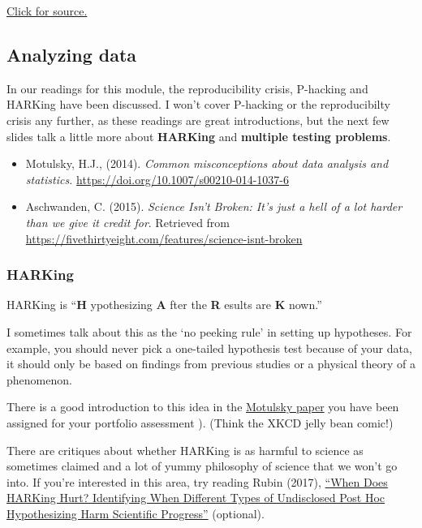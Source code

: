 \documentclass[
  openany]{book}
\providecommand{\tightlist}{%
  \setlength{\itemsep}{0pt}\setlength{\parskip}{0pt}}
\begin{document}
\href{https://www.thequotes.net/2013/08/failures-are-stepping-stones-to-success/}{Click for source.}

\hypertarget{analyzingethics}{%
\subsection{Analyzing data}\label{analyzingethics}}

In our readings for this module, the reproducibility crisis, P-hacking and HARKing have been discussed. I won't cover P-hacking or the reproducibilty crisis any further, as these readings are great introductions, but the next few slides talk a little more about \textbf{HARKing} and \textbf{multiple testing problems}.

\begin{itemize}
\tightlist
\item
  Motulsky, H.J., (2014). \emph{Common misconceptions about data analysis and statistics.} \url{https://doi.org/10.1007/s00210-014-1037-6}
\item
  Aschwanden, C. (2015). \emph{Science Isn't Broken: It's just a hell of a lot harder than we give it credit for}. Retrieved from \url{https://fivethirtyeight.com/features/science-isnt-broken}
\end{itemize}

\hypertarget{harking}{%
\subsubsection{HARKing}\label{harking}}

HARKing is ``\textbf{H} ypothesizing \textbf{A} fter the \textbf{R} esults are \textbf{K} nown.''

I sometimes talk about this as the `no peeking rule' in setting up hypotheses. For example, you should never pick a one-tailed hypothesis test because of your data, it should only be based on findings from previous studies or a physical theory of a phenomenon.

There is a good introduction to this idea in the \href{https://link.springer.com/article/10.1007\%2Fs00210-014-1037-6}{Motulsky paper} you have been assigned for your portfolio assessment ). (Think the XKCD jelly bean comic!)

There are critiques about whether HARKing is as harmful to science as sometimes claimed and a lot of yummy philosophy of science that we won't go into. If you're interested in this area, try reading Rubin (2017), \href{https://journals.sagepub.com/doi/10.1037/gpr0000128}{``When Does HARKing Hurt? Identifying When Different Types of Undisclosed Post Hoc Hypothesizing Harm Scientific Progress''} (optional).
\end{document}
